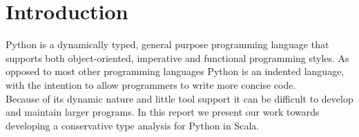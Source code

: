 \chapter{Introduction}
Python is a dynamically typed, general purpose programming language that supports both object-oriented, imperative and functional programming styles. As opposed to most other programming languages Python is an indented language, with the intention to allow programmers to write more concise code. \\
Because of its dynamic nature and little tool support it can be difficult to develop and maintain larger programs. In this report we present our work towards developing a conservative type analysis for Python in Scala.